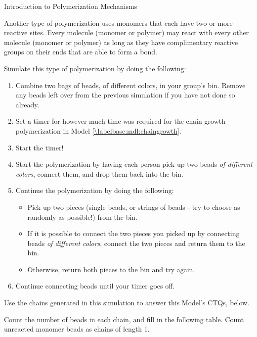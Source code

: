 \begin{activity}{Introduction to Polymerization Mechanisms}
\begin{model}
	Another type of polymerization uses monomers that each have two or more reactive sites.  Every molecule (monomer or polymer) may react with every other molecule (monomer or polymer) as long as they have complimentary reactive groups on their ends that are able to form a bond.
	
	Simulate this type of polymerization by doing the following:
	\begin{enumerate}
		\item Combine two bags of beads, of different colors, in your group's bin.  Remove any beads left over from the previous simulation if you have not done so already.
		\item Set a timer for however much time was required for the chain-growth polymerization in Model \ref{\labelbase:mdl:chaingrowth}.
		\item Start the timer!
		\item Start the polymerization by having each person pick up two beads \emph{of different colors}, connect them, and drop them back into the bin.
		\item Continue the polymerization by doing the following:
			\begin{itemize}
				\item Pick up two pieces (single beads, or strings of beads - try to choose as randomly as possible!) from the bin.
				\item If it is possible to connect the two pieces you picked up by connecting beads \emph{of different colors}, connect the two pieces and return them to the bin.
				\item Otherwise, return both pieces to the bin and try again.
			\end{itemize}
		\item Continue connecting beads until your timer goes off.
	\end{enumerate}
	
	Use the chains generated in this simulation to answer this Model's CTQs, below.

\end{model}
	
\begin{ctqs}

	\question Count the number of beads in each chain, and fill in the following table.  Count unreacted monomer beads as chains of length 1. \label{\labelbase:ctq:numbeadsstep}
		

\end{ctqs}
\end{activity}
